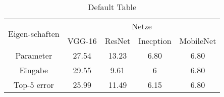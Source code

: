 \begin{table}[htbp]
	\caption{Default Table}
	\label{Tab:SRNRValues}
	\begin{center}
		\begin{tabular}{|c|c|c|c|c|}
			\hline
			\multirow{2}{1.5cm}{Eigen-schaften}& \multicolumn{4}{p{5cm}|}{\centering Netze} \\
			\cline{2-5} & \multicolumn{1}{c|}{VGG-16} & \multicolumn{1}{c|}{ResNet} & \multicolumn{1}{c|}{Inecption} & \multicolumn{1}{c|}{MobileNet} \\ \hline
			Parameter & 27.54 & 13.23 & 6.80 & 6.80 \\
			Eingabe & 29.55 & 9.61 & 6 & 6.80 \\
			Top-5 error & 25.99 & 11.49 & 6.15 & 6.80 \\
			\hline
		\end{tabular}
	\end{center}
\end{table}
